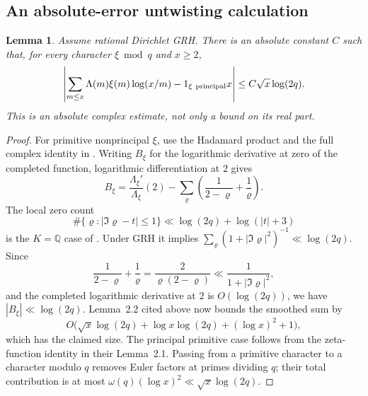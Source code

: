 \documentclass[11pt]{article}
\newtheorem{lemma}[theorem]{Lemma}
\theoremstyle{definition}
\theoremstyle{remark}
\begin{document}
\subsection{An absolute-error untwisting calculation}

\begin{lemma}\label{lem:complex-dirichlet-tent}
Assume rational Dirichlet GRH. There is an absolute constant \(C\)
such that, for every character \(\xi\bmod q\) and \(x\geq2\),
\[
 \left|\sum_{m\leq x}\Lambda(m)\xi(m)\log(x/m)
       -1_{\xi\ {\rm principal}}x\right|
 \leq C\sqrt x\log(2q).
\]
This is an absolute complex estimate, not only a bound on its real
part.
\end{lemma}
\begin{proof}
For primitive nonprincipal \(\xi\), use the Hadamard product
and the full complex identity in
\citet[equation~(2.3) and Lemma~2.2, corrected author p.~5]{LLS2015}.
Writing \(B_\xi\) for the logarithmic derivative at zero of the
completed function, logarithmic differentiation at \(2\) gives
\[
 B_\xi=\frac{\Lambda_\xi'}{\Lambda_\xi}(2)
       -\sum_\varrho\left(\frac1{2-\varrho}+\frac1\varrho\right).
\]
The local zero count
\[
 \#\{\varrho:|\Im\varrho-t|\leq1\}
 \ll \log(2q)+\log(|t|+3)
\]
is the \(K=\mathbb Q\) case of
\citet[Lemma~2.5, printed p.~1050]{ThornerZaman2019}.
Under GRH it implies
\(\sum_\varrho(1+|\Im\varrho|^2)^{-1}\ll\log(2q)\).
Since
\[
 \frac1{2-\varrho}+\frac1\varrho
 =\frac2{\varrho(2-\varrho)}
 \ll \frac1{1+|\Im\varrho|^2},
\]
and the completed logarithmic derivative at \(2\) is
\(O(\log(2q))\), we have \(|B_\xi|\ll\log(2q)\).
Lemma~2.2 cited above now bounds the smoothed sum by
\[
 O\bigl(\sqrt x\log(2q)+
       \log x\log(2q)+(\log x)^2+1\bigr),
\]
which has the claimed size. The principal primitive case follows
from the zeta-function identity in their Lemma~2.1.
Passing from a primitive character to a character modulo \(q\)
removes Euler factors at primes dividing \(q\); their total
contribution is at most
\(\omega(q)(\log x)^2\ll\sqrt x\log(2q)\).
\end{proof}
\end{document}
